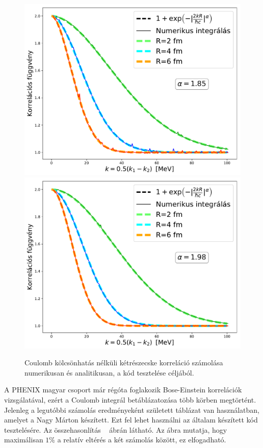 \documentclass[11pt,a4paper]{article}
\numberwithin{equation}{subsection}
\numberwithin{figure}{section}
\begin{document}
\begin{figure}[H]
\centering
\includegraphics[scale=0.36]{pic/Coulomb/C2_noCoulomb_R246_a185.pdf}
\includegraphics[scale=0.36]{pic/Coulomb/C2_noCoulomb_R246_a198.pdf}
\caption{Coulomb kölcsönhatás nélküli kétrészecske korreláció számolása numerikusan és analitikusan, a kód tesztelése céljából.}
\label{fig:CRT}
\end{figure}


A PHENIX magyar csoport már régóta foglakozik Bose-Einstein korrelációk vizsgálatával, ezért a Coulomb integrál betáblázatozása több körben megtörtént. Jelenleg a legutóbbi számolás eredményeként született táblázat van használatban, amelyet a Nagy Márton készített. Ezt fel lehet használni az általam készített kód tesztelésére. Az összehasonlítás ~ ábrán látható. Az ábra mutatja, hogy maximálisan $1\%$ a relatív eltérés a két számolás között, ez elfogadható.
\end{document}
